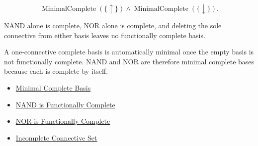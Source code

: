 \begin{remark*}
\[
\operatorname{MinimalComplete}(\{\uparrow\})
\land
\operatorname{MinimalComplete}(\{\downarrow\}).
\]
\end{remark*}

\begin{remark*}
NAND alone is complete, NOR alone is complete, and deleting the sole connective
from either basis leaves no functionally complete basis.
\end{remark*}

\begin{remark*}[Interpretation]
A one-connective complete basis is automatically minimal once the empty basis is
not functionally complete. NAND and NOR are therefore minimal complete bases
because each is complete by itself.
\end{remark*}

\begin{dependencies}
\begin{itemize}
  \item \hyperref[def:minimal-complete-basis-propositional-logic]{Minimal Complete Basis}
  \item \hyperref[thm:nand-functionally-complete-propositional-logic]{NAND is Functionally Complete}
  \item \hyperref[thm:nor-functionally-complete-propositional-logic]{NOR is Functionally Complete}
  \item \hyperref[def:incomplete-connective-set-propositional-logic]{Incomplete Connective Set}
\end{itemize}
\end{dependencies}
